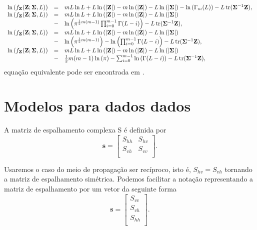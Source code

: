 \begin{equation}\label{cap_acf_12}
\begin{array}{cll}
	\ln{\left(f_{\mathbf{Z}}(\mathbf{Z};\mathbf{\Sigma},L)\right)}&=&mL\ln{L}+L\ln{\left(|\mathbf{Z}|\right)}-m\ln{\left(|\mathbf{Z}|\right)} - L\ln{\left(|\mathbf{\Sigma}|\right)}-\ln{\left(\Gamma_m(L)\right)}-L\operatorname{tr}(\mathbf{\Sigma}^{-1}\mathbf{Z}), \\
	\ln{\left(f_{\mathbf{Z}}(\mathbf{Z};\mathbf{\Sigma},L)\right)}&=&mL\ln{L}+L\ln{\left(|\mathbf{Z}|\right)}-m\ln{\left(|\mathbf{Z}|\right)} - L\ln{\left(|\mathbf{\Sigma}|\right)}\\
	&-&\ln{\left(\pi^{\frac{1}{2}m(m-1)} \prod_{i=0}^{m-1}\Gamma(L-i)\right)}-L\operatorname{tr}(\mathbf{\Sigma}^{-1}\mathbf{Z}),\\
	\ln{\left(f_{\mathbf{Z}}(\mathbf{Z};\mathbf{\Sigma},L)\right)}&=&mL\ln{L}+L\ln{\left(|\mathbf{Z}|\right)}-m\ln{\left(|\mathbf{Z}|\right)} - L\ln{\left(|\mathbf{\Sigma}|\right)}\\
        &-&\ln{\left(\pi^{\frac{1}{2}m(m-1)}\right)}-\ln{\left( \prod_{i=0}^{m-1}\Gamma(L-i)\right)}-L\operatorname{tr}(\mathbf{\Sigma}^{-1}\mathbf{Z}), \\
	\ln{\left(f_{\mathbf{Z}}(\mathbf{Z};\mathbf{\Sigma},L)\right)}&=&mL\ln{L}+L\ln{\left(|\mathbf{Z}|\right)}-m\ln{\left(|\mathbf{Z}|\right)} - L\ln{\left(|\mathbf{\Sigma}|\right)}\\
        &-&\frac{1}{2}m(m-1)\ln{\left(\pi\right)}-\sum_{i=0}^{m-1}\ln{\left(\Gamma(L-i)\right)}-L\operatorname{tr}(\mathbf{\Sigma}^{-1}\mathbf{Z}),\\
\end{array}
\end{equation}
equação equivalente pode ser encontrada em \citep{fnc2011}.


\section{Modelos para dados dados}

A matriz de espalhamento complexa {\boldmath S} é definida por
$$
\mathbf{ s} = \left[
\begin{array}{cc}
	S_{hh}   & S_{hv}   \\
	S_{vh}   & S_{vv}   \\
\end{array}
\right].
$$

Usaremos o caso do meio de propagação ser recíproco, isto é, $S_{hv}=S_{vh}$ tornando a matriz de espalhamento simétrica. Podemos facilitar a notação representando a matriz de espalhamento por um vetor da seguinte forma
$$
\mathbf{s} = \left[
\begin{array}{c}
	S_{vv}      \\
	S_{vh}     \\
	S_{hh}      \\
\end{array}
\right].
$$

